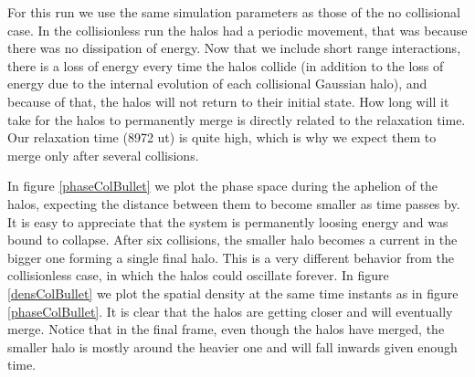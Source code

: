 For this run we use the same simulation parameters as those of the no collisional case.
In the collisionless run the halos had a periodic movement, that was because there was no dissipation of energy.
Now that we include short range interactions, there is a loss of energy every time the halos collide (in addition to the loss of energy due to the internal evolution of each collisional Gaussian halo), and because of that, the halos will not return to their initial state. How long will it take for the halos to permanently merge is directly related to the relaxation time. Our relaxation time (8972 ut) is quite high, which is why we expect them to merge only after several collisions.

In figure \ref{phaseColBullet} we plot the phase space during the aphelion of the halos, expecting the distance between them to become smaller as time passes by. It is easy to appreciate that the system is permanently loosing energy and was bound to collapse.
After six collisions, the smaller halo becomes a current in the bigger one forming a single final halo.
This is a very different behavior from the collisionless case, in which the halos could oscillate forever.
In figure \ref{densColBullet} we plot the spatial density at the same time instants as in figure \ref{phaseColBullet}. It is clear that the halos are getting closer and will eventually merge. Notice that in the final frame, even though the halos have merged, the smaller halo is mostly around the heavier one and will fall inwards given enough time.

